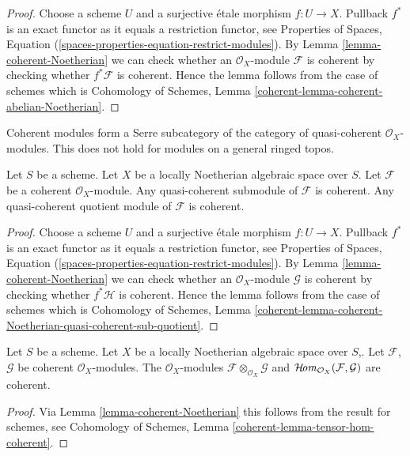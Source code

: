 \begin{proof}
Choose a scheme $U$ and a surjective \'etale morphism $f : U \to X$.
Pullback $f^*$ is an exact functor as it equals a restriction functor, see
Properties of Spaces, Equation
(\ref{spaces-properties-equation-restrict-modules}).
By
Lemma \ref{lemma-coherent-Noetherian} we can check whether an
$\mathcal{O}_X$-module $\mathcal{F}$ is
coherent by checking whether $f^*\mathcal{F}$ is coherent. Hence the
lemma follows from the case of schemes which is
Cohomology of Schemes, Lemma \ref{coherent-lemma-coherent-abelian-Noetherian}.
\end{proof}

\noindent
Coherent modules form a Serre subcategory of the
category of quasi-coherent $\mathcal{O}_X$-modules. This does not hold
for modules on a general ringed topos.

\begin{lemma}
\label{lemma-coherent-Noetherian-quasi-coherent-sub-quotient}
Let $S$ be a scheme.
Let $X$ be a locally Noetherian algebraic space over $S$.
Let $\mathcal{F}$ be a coherent $\mathcal{O}_X$-module.
Any quasi-coherent submodule of $\mathcal{F}$ is coherent.
Any quasi-coherent quotient module of $\mathcal{F}$ is coherent.
\end{lemma}

\begin{proof}
Choose a scheme $U$ and a surjective \'etale morphism $f : U \to X$.
Pullback $f^*$ is an exact functor as it equals a restriction functor, see
Properties of Spaces, Equation
(\ref{spaces-properties-equation-restrict-modules}).
By
Lemma \ref{lemma-coherent-Noetherian} we can check whether an
$\mathcal{O}_X$-module $\mathcal{G}$ is
coherent by checking whether $f^*\mathcal{H}$ is coherent. Hence the
lemma follows from the case of schemes which is
Cohomology of Schemes, Lemma
\ref{coherent-lemma-coherent-Noetherian-quasi-coherent-sub-quotient}.
\end{proof}

\begin{lemma}
\label{lemma-tensor-hom-coherent}
Let $S$ be a scheme.
Let $X$ be a locally Noetherian algebraic space over $S$,.
Let $\mathcal{F}$, $\mathcal{G}$ be coherent $\mathcal{O}_X$-modules.
The $\mathcal{O}_X$-modules $\mathcal{F} \otimes_{\mathcal{O}_X} \mathcal{G}$
and $\mathop{\mathcal{H}\!\mathit{om}}\nolimits_{\mathcal{O}_X}(\mathcal{F}, \mathcal{G})$ are
coherent.
\end{lemma}

\begin{proof}
Via Lemma \ref{lemma-coherent-Noetherian} this follows from the result
for schemes, see
Cohomology of Schemes, Lemma \ref{coherent-lemma-tensor-hom-coherent}.
\end{proof}

